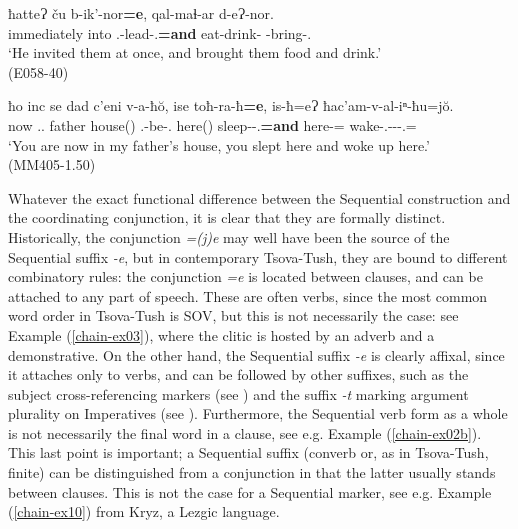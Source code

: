 \begin{exe}
	\ex\label{chain-ex04}
	\begin{xlist}
		
		
			\ex\label{chain-ex04a}
			\gll ħatteɁ ču b-ik'-nor\textbf{=e}, qal-maɬ-ar d-eɁ-nor. \\
			immediately into {\M}.{\Pl}-lead-{\Nw}.{\Rem}\textbf{=and} eat-drink-{\Vn} {\D}-bring-{\Nw}.{\Rem} \\
			\trans `He invited them at once, and brought them food and drink.' \\
			\hfill (E058-40)
		
			\ex\label{chain-ex04b}
			\gll  ħo inc se dad c'eni v-a-ħ\u{o}, ise toħ-ra-ħ\textbf{=e}, is-ħ=eɁ ħac'am-v-al-iⁿ-ħu=j\u{o}. \\
			{\Ssg} now {\Fsg}.{\Gen}.{\Obl} father house({\Ess}) {\M}.{\Sg}-be-{\Fsg}.{\Nom} here({\Ess}) sleep-{\Imprf}-{\Ssg}.{\Nom}\textbf{=and} here-{\Ess}={\Emph} wake-{\M}.{\Sg}-{\Intr}-{\Aor}-{\Ssg}.{\Nom}={\Quot}\\
			\trans `You are now in my father’s house, you slept here and woke up here.' \\
			(MM405-1.50)
		
		
	\end{xlist}
\end{exe}


Whatever the exact functional difference between the Sequential construction and the coordinating conjunction, it is clear that they are formally distinct. Historically, the conjunction \textit{=(j)e} may well have been the source of the Sequential suffix \textit{-e}, but in contemporary Tsova-Tush, they are bound to different combinatory rules: the conjunction \textit{=e} is located between clauses, and can be attached to any part of speech. These are often verbs, since the most common word order in Tsova-Tush is SOV, but this is not necessarily the case: see Example (\ref{chain-ex03}), where the clitic is hosted by an adverb and a demonstrative. On the other hand, the Sequential suffix \textit{-e} is clearly affixal, since it attaches only to verbs, and can be followed by other suffixes, such as the subject cross-referencing markers (see ) and the suffix \textit{-t} marking argument plurality on Imperatives (see ). Furthermore, the Sequential verb form as a whole is not necessarily the final word in a clause, see e.g. Example (\ref{chain-ex02b}). This last point is important; a Sequential suffix (converb or, as in Tsova-Tush, finite) can be distinguished from a conjunction in that the latter usually stands between clauses. This is not the case for a Sequential marker, see e.g. Example (\ref{chain-ex10}) from Kryz, a Lezgic language.

